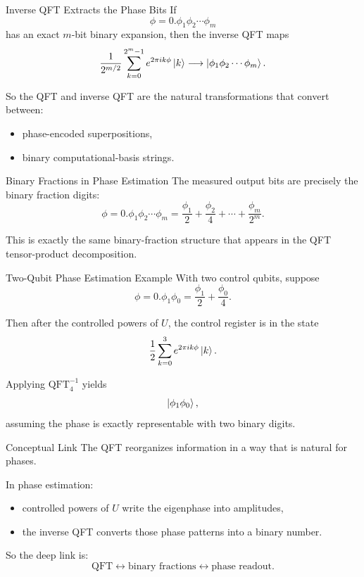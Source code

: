 \documentclass{beamer}
\begin{document}

\begin{frame}{Inverse QFT Extracts the Phase Bits}
If
\[
\phi = 0.\phi_1\phi_2\cdots \phi_m
\]
has an exact \(m\)-bit binary expansion, then the inverse QFT maps
\[
\frac{1}{2^{m/2}}
\sum_{k=0}^{2^m-1} e^{2\pi i k\phi}\ket{k}
\longrightarrow
\ket{\phi_1\phi_2\cdots \phi_m}.
\]

So the QFT and inverse QFT are the natural transformations that convert between:
\begin{itemize}
\item phase-encoded superpositions,
\item binary computational-basis strings.
\end{itemize}
\end{frame}


\begin{frame}{Binary Fractions in Phase Estimation}
The measured output bits are precisely the binary fraction digits:
\[
\phi = 0.\phi_1\phi_2\cdots \phi_m
=
\frac{\phi_1}{2}+\frac{\phi_2}{4}+\cdots+\frac{\phi_m}{2^m}.
\]

This is exactly the same binary-fraction structure that appears in the QFT tensor-product decomposition.
\end{frame}


\begin{frame}{Two-Qubit Phase Estimation Example}
With two control qubits, suppose
\[
\phi = 0.\phi_1\phi_0
=
\frac{\phi_1}{2}+\frac{\phi_0}{4}.
\]

Then after the controlled powers of \(U\), the control register is in the state
\[
\frac{1}{2}
\sum_{k=0}^{3} e^{2\pi i k\phi}\ket{k}.
\]

Applying \(\mathrm{QFT}_4^{-1}\) yields
\[
\ket{\phi_1\phi_0},
\]
assuming the phase is exactly representable with two binary digits.
\end{frame}


\begin{frame}{Conceptual Link}
The QFT reorganizes information in a way that is natural for phases.

\medskip

In phase estimation:
\begin{itemize}
\item controlled powers of \(U\) write the eigenphase into amplitudes,
\item the inverse QFT converts those phase patterns into a binary number.
\end{itemize}

So the deep link is:
\[
\text{QFT} \leftrightarrow \text{binary fractions} \leftrightarrow \text{phase readout}.
\]
\end{frame}
\end{document}
